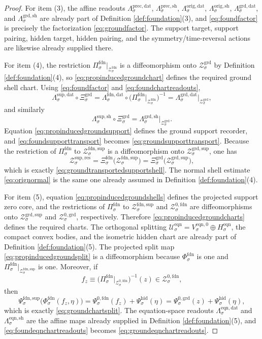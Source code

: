 \documentclass[11pt]{article}
\newcommand{\ResData}[1]{\Lambda_{#1}^{\mathrm{sup,dat}}}
\newcommand{\ResShellMap}[1]{\Lambda_{#1}^{\mathrm{sup,sh}}}
\newcommand{\ResShellSet}[1]{\mathcal Z_{#1}^{\mathrm{sup,res}}}
\newcommand{\HiddenChart}[1]{\Psi_{#1}^{\mathrm{hid}}}
\newcommand{\PrecData}[1]{\Lambda_{#1}^{\mathrm{prec,dat}}}
\newcommand{\PrecShellMap}[1]{\Lambda_{#1}^{\mathrm{prec,sh}}}
\newcommand{\OrigData}[1]{\Lambda_{#1}^{\mathrm{orig,dat}}}
\newcommand{\OrigShellMap}[1]{\Lambda_{#1}^{\mathrm{orig,sh}}}
\newcommand{\GroundData}[1]{\Lambda_{#1}^{\mathrm{grd,dat}}}
\newcommand{\GroundShellMap}[1]{\Lambda_{#1}^{\mathrm{grd,sh}}}
\newcommand{\GroundShellSet}[1]{\mathcal Z_{#1}^{\mathrm{grd}}}
\newcommand{\GroundChart}[1]{\Xi_{#1}^{\mathrm{grd}}}
\newcommand{\GroundSupportShell}[1]{\mathcal Z_{#1}^{\mathrm{grd,sup}}}
\newcommand{\GroundZeroCore}[1]{\mathcal Z_{#1}^{0,\mathrm{grd}}}
\newcommand{\GroundZeroChart}[1]{\Psi_{#1}^{0,\mathrm{grd}}}
\newcommand{\FoundProj}[1]{\Pi_{#1}^{\mathrm{fdn}}}
\newcommand{\FoundData}[1]{\Lambda_{#1}^{\mathrm{fdn,dat}}}
\newcommand{\FoundShellSet}[1]{\mathcal Z_{#1}^{\mathrm{fdn}}}
\newcommand{\FoundChart}[1]{\Xi_{#1}^{\mathrm{fdn}}}
\newcommand{\FoundSupportShell}[1]{\mathcal Z_{#1}^{\mathrm{fdn,sup}}}
\newcommand{\FoundZeroCore}[1]{\mathcal Z_{#1}^{0,\mathrm{fdn}}}
\newcommand{\FoundEqChart}[1]{\Psi_{#1}^{\mathrm{fdn,sup}}}
\newcommand{\FoundZeroChart}[1]{\Psi_{#1}^{0,\mathrm{fdn}}}
\newcommand{\FoundSplit}[1]{\Phi_{#1}^{\mathrm{fdn}}}
\newcommand{\EqnSpace}[1]{\mathcal U_{#1}^{\mathrm{eqn}}}
\newcommand{\EqnData}[1]{\Lambda_{#1}^{\mathrm{eqn,dat}}}
\newcommand{\EqnShell}[1]{\Lambda_{#1}^{\mathrm{eqn,sh}}}
\newcommand{\EqnHidden}[1]{H_{#1}^{\mathrm{eqn}}}
\newcommand{\EqnZero}[1]{V_{#1}^{\mathrm{eqn},0}}
\begin{document}
\begin{proof}
For item (3), the affine readouts \(\PrecData{\sigma}\), \(\PrecShellMap{\sigma}\), \(\OrigData{\sigma}\), \(\OrigShellMap{\sigma}\), \(\GroundData{\sigma}\), and \(\GroundShellMap{\sigma}\) are already part of Definition \ref{def:foundation}(3), and \eqref{eq:foundfactor} is precisely the factorization \eqref{eq:groundfactor}. The support target, support pairing, hidden target, hidden pairing, and the symmetry/time-reversal actions are likewise already supplied there.

For item (4), the restriction \(\FoundProj{\sigma}\big|_{\FoundShellSet{\sigma}}\) is a diffeomorphism onto \(\GroundShellSet{\sigma}\) by Definition \ref{def:foundation}(4), so \eqref{eq:propinducedgroundchart} defines the required ground shell chart. Using \eqref{eq:foundfactor} and \eqref{eq:foundchartreadouts},
\[
\ResData{\sigma}\circ\GroundChart{\sigma}
=
\FoundData{\sigma}\circ
\bigl(\FoundProj{\sigma}\big|_{\FoundShellSet{\sigma}}\bigr)^{-1}
=
\GroundData{\sigma}\big|_{\GroundShellSet{\sigma}},
\]
and similarly
\[
\ResShellMap{\sigma}\circ\GroundChart{\sigma}
=
\GroundShellMap{\sigma}\big|_{\GroundShellSet{\sigma}}.
\]
Equation \eqref{eq:propinducedgroundsupport} defines the ground support recorder, and \eqref{eq:foundsupporttransport} becomes \eqref{eq:groundsupporttransport}. Because the restriction of \(\FoundProj{\sigma}\) to \(\FoundSupportShell{\sigma}\) is a diffeomorphism onto \(\GroundSupportShell{\sigma}\), one has
\[
\ResShellSet{\sigma}
=
\FoundChart{\sigma}\bigl(\FoundSupportShell{\sigma}\bigr)
=
\GroundChart{\sigma}\bigl(\GroundSupportShell{\sigma}\bigr),
\]
which is exactly \eqref{eq:groundtransportedsupportshell}. The normal shell estimate \eqref{eq:orignormal} is the same one already assumed in Definition \ref{def:foundation}(4).

For item (5), equation \eqref{eq:propinducedgroundshells} defines the projected support zero core, and the restrictions of \(\FoundProj{\sigma}\) to \(\FoundSupportShell{\sigma}\) and \(\FoundZeroCore{\sigma}\) are diffeomorphisms onto \(\GroundSupportShell{\sigma}\) and \(\GroundZeroCore{\sigma}\), respectively. Therefore \eqref{eq:propinducedgroundcharts} defines the required charts. The orthogonal splitting \(\EqnSpace{\sigma}=\EqnZero{\sigma}\oplus\EqnHidden{\sigma}\), the compact convex bodies, and the isometric hidden chart are already part of Definition \ref{def:foundation}(5). The projected split map \eqref{eq:propinducedgroundsplit} is a diffeomorphism because \(\FoundSplit{\sigma}\) is one and \(\FoundProj{\sigma}\big|_{\FoundSupportShell{\sigma}}\) is one. Moreover, if
\[
f_z
\equiv
\bigl(\FoundProj{\sigma}\big|_{\FoundZeroCore{\sigma}}\bigr)^{-1}(z)
\in
\FoundZeroCore{\sigma},
\]
then
\[
\FoundEqChart{\sigma}\bigl(\FoundSplit{\sigma}(f_z,\eta)\bigr)
=
\FoundZeroChart{\sigma}(f_z)+\HiddenChart{\sigma}(\eta)
=
\GroundZeroChart{\sigma}(z)+\HiddenChart{\sigma}(\eta),
\]
which is exactly \eqref{eq:groundchartsplit}. The equation-space readouts \(\EqnData{\sigma}\) and \(\EqnShell{\sigma}\) are the affine maps already supplied in Definition \ref{def:foundation}(5), and \eqref{eq:foundeqnchartreadouts} becomes \eqref{eq:groundeqnchartreadouts}.


\end{proof}
\end{document}
